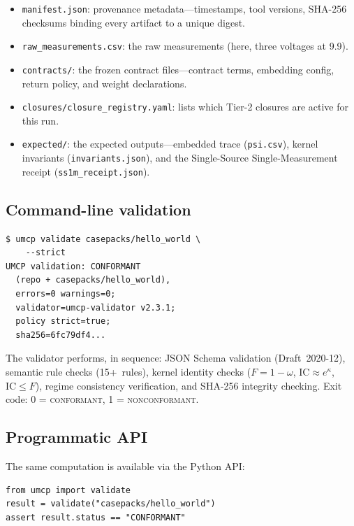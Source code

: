 \documentclass[
  aps,
  prd,
  twocolumn,
  superscriptaddress,
  nofootinbib,
  floatfix
]{revtex4-2}
\newcommand{\regime}[1]{\textrm{\upshape\scshape#1}}
\newcommand{\conform}{\regime{conformant}}
\newcommand{\nonconform}{\regime{nonconformant}}
\newcommand{\IC}{\mathrm{IC}}
\begin{document}
\begin{itemize}[leftmargin=*,nosep]
  \item \texttt{manifest.json}: provenance metadata---timestamps,
    tool versions, SHA-256 checksums binding every artifact to a
    unique digest.
  \item \texttt{raw\_measurements.csv}: the raw measurements (here,
    three voltages at 9.9).
  \item \texttt{contracts/}: the frozen contract files---contract
    terms, embedding config, return policy, and weight declarations.
  \item \texttt{closures/closure\_registry.yaml}: lists which Tier-2
    closures are active for this run.
  \item \texttt{expected/}: the expected outputs---embedded trace
    (\texttt{psi.csv}), kernel invariants
    (\texttt{invariants.json}), and the Single-Source
    Single-Measurement receipt (\texttt{ss1m\_receipt.json}).
\end{itemize}

\subsection{Command-line validation}

\begin{Verbatim}[fontsize=\small]
$ umcp validate casepacks/hello_world \
    --strict
UMCP validation: CONFORMANT
  (repo + casepacks/hello_world),
  errors=0 warnings=0;
  validator=umcp-validator v2.3.1;
  policy strict=true;
  sha256=6fc79df4...
\end{Verbatim}

The validator performs, in sequence: JSON Schema validation
(Draft~2020-12), semantic rule checks (15+~rules), kernel identity
checks ($F = 1 - \omega$, $\IC \approx e^\kappa$, $\IC \leq F$),
regime consistency verification, and SHA-256 integrity checking.
Exit code: 0 = \conform{}, 1 = \nonconform{}.

\subsection{Programmatic API}

The same computation is available via the Python API:

\begin{Verbatim}[fontsize=\small]
from umcp import validate
result = validate("casepacks/hello_world")
assert result.status == "CONFORMANT"
\end{Verbatim}
\end{document}
